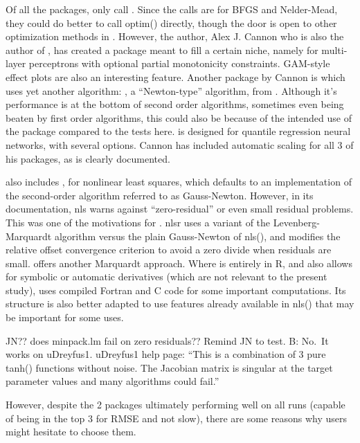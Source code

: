 Of all the packages, only  \citep{R-monmlp} call
. Since the calls are for BFGS and Nelder-Mead, they
could do better to call optim() directly, though the door is open to
other optimization methods in . However, the author,
Alex J. Cannon who is also the author of , has created
a package meant to fill a certain niche, namely for multi-layer
perceptrons with optional partial monotonicity constraints. GAM-style
effect plots are also an interesting feature. Another package by Cannon
is  \citep{R-qrnn} which uses yet another algorithm:
, a ``Newton-type'' algorithm, from .
Although it's performance is at the bottom of second order algorithms,
sometimes even being beaten by first order algorithms, this could also
be because of the intended use of the package compared to the tests
here.  is designed for quantile regression neural
networks, with several options. Cannon has included automatic scaling
for all 3 of his packages, as is clearly documented.

 also includes , for nonlinear least squares,
which defaults to an implementation of the second-order algorithm
referred to as Gauss-Newton. However, in its documentation, nls warns
against ``zero-residual'' or even small residual problems. This was one
of the motivations for  \citep{R-nlsr}. nlsr uses a
variant \citep{jn77ima} of the Levenberg-Marquardt algorithm versus the
plain Gauss-Newton of nls(), and modifies the relative offset
convergence criterion to avoid a zero divide when residuals are small.
 \citep{minpack.lm} offers another Marquardt
approach. Where  is entirely in R, and also allows for
symbolic or automatic derivatives (which are not relevant to the present
study),  uses compiled Fortran and C code for some
important computations. Its structure is also better adapted to use
features already available in nls() that may be important for some uses.

JN?? does minpack.lm fail on zero residuals?? Remind JN to test. B:
No.~It works on uDreyfus1. uDreyfus1 help page: ``This is a combination
of 3 pure tanh() functions without noise. The Jacobian matrix is
singular at the target parameter values and many algorithms could
fail.''

However, despite the 2 packages ultimately performing well on all runs
(capable of being in the top 3 for RMSE and not slow), there are some
reasons why users might hesitate to choose them.


